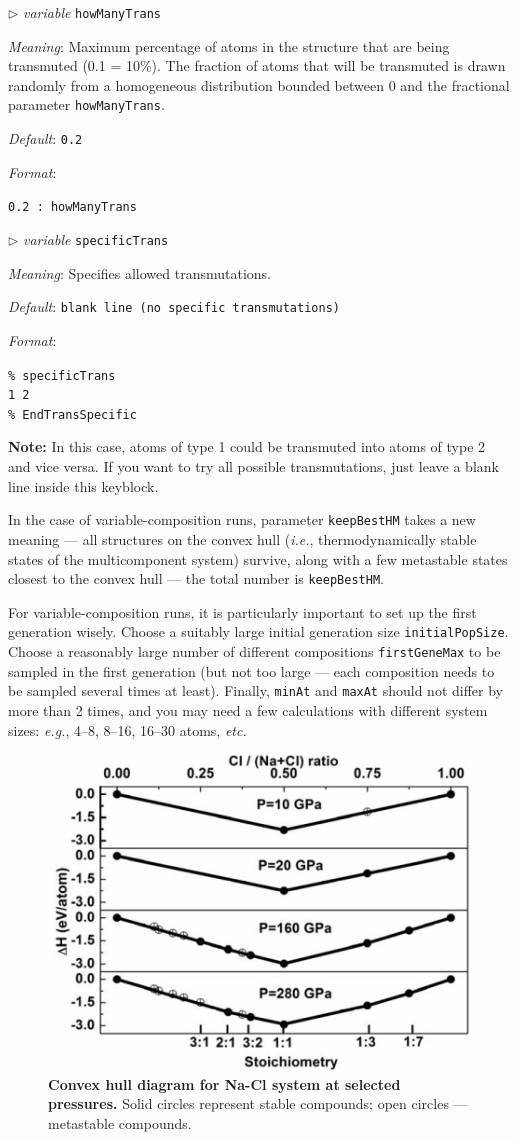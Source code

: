 \documentclass[12pt]{article}
\newcommand{\keyword}[1]{\texttt{#1}}
\newcommand{\paramacro}[6]{
\vspace{0.5cm}
$\triangleright$ \emph{variable} {\color{blue} \texttt{#1}}

\emph{Meaning}: {#2}

{#3}

\emph{Default}: \texttt{#4}

\emph{Format}:

{\addtolength{\leftskip}{10mm} 
\texttt{#5}
\par}


{\small #6}

}
\begin{document}
\paramacro{howManyTrans}{Maximum percentage of atoms in the structure that are
being transmuted (0.1 = 10\%). The fraction of atoms that will be transmuted is
drawn randomly from a homogeneous distribution bounded between 0 and the
fractional parameter \keyword{howManyTrans}.}{}{0.2}{0.2  : howManyTrans}{}

\paramacro{specificTrans}{Specifies allowed transmutations.}{}{\rm blank
line (no specific transmutations)}{\% specificTrans \\
1 2 \\
\% EndTransSpecific}{\textbf{Note:} In this case, atoms of type 1 could be
transmuted into atoms of type 2 and vice versa. If you want to try all possible
transmutations, just leave a blank line inside this keyblock.}

\vspace{0.5cm}

In the case of variable-composition runs, parameter \keyword{keepBestHM} takes a
new meaning --- all structures on the convex hull (\emph{i.e.},
thermodynamically stable states of the multicomponent system) survive, along
with a few metastable states closest to the convex hull --- the total number is
\keyword{keepBestHM}.

For variable-composition runs, it is particularly important to set up the first
generation wisely. Choose a suitably large initial generation size
\keyword{initialPopSize}. Choose a reasonably large number of different
compositions \keyword{firstGeneMax} to be sampled in the first generation (but
not too large --- each composition needs to be sampled several times at least).
Finally, \keyword{minAt} and \keyword{maxAt} should not differ by more than 2
times, and you may need a few calculations with different system sizes:
\emph{e.g.}, 4--8, 8--16, 16--30 atoms, \emph{etc.}

\begin{figure}[htbp] \centering \includegraphics[scale=0.4]{pic/NaCl}
\caption{\footnotesize \textbf{Convex hull diagram for Na-Cl system at selected
pressures.} Solid circles represent stable compounds; open circles ---
metastable compounds.}
\label{fig:NaCl}
\end{figure}
\end{document}
